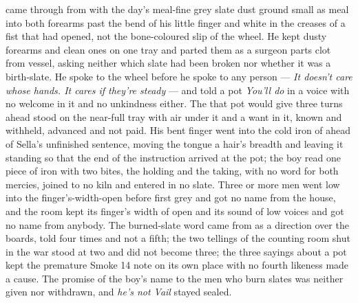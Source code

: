  came through from  with the day's meal-fine grey slate dust ground small as meal into both forearms past the bend of his little finger and white in the creases of a fist that had opened, not the bone-coloured slip of the wheel. He kept dusty forearms and clean ones on one tray and parted them as a surgeon parts clot from vessel, asking neither which slate had been broken nor whether it was a birth-slate. He spoke to the wheel before he spoke to any person --- \emph{It doesn't care whose hands. It cares if they're steady} --- and told a pot \emph{You'll do} in a voice with no welcome in it and no unkindness either. The  that pot would give three turns ahead stood on the near-full tray with air under it and a want in it, known and withheld, advanced and not paid. His bent finger went into the cold iron of  ahead of Sella's unfinished sentence, moving the tongue a hair's breadth and leaving it standing so that the end of the instruction arrived at the pot; the boy read one piece of iron with two bites, the holding and the taking, with no  word for both mercies, joined to no kiln and entered in no slate. Three or more men went low into the finger's-width-open  before first grey and got no name from the house, and the room kept its finger's width of open and its sound of low voices and got no name from anybody. The burned-slate word came from  as a direction over the boards, told four times and not a fifth; the two tellings of the counting room shut in the war stood at two and did not become three; the three sayings about a pot kept the premature Smoke 14 note on its own place with no fourth likeness made a cause. The promise of the boy's name to the men who burn slates was neither given nor withdrawn, and \emph{he's not Vail} stayed sealed.

